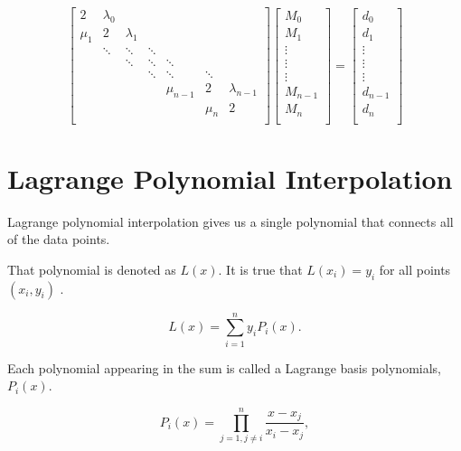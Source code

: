 \documentclass{article}
\begin{document}
 
\begin{equation*}
  \begin{bmatrix}
    2 & \lambda_0 \\ 
    \mu_1 & 2 & \lambda_1 \\ 
    & \ddots & \ddots & \ddots \\
    && \ddots & \ddots & \ddots \\
	&&& \ddots & \ddots & \ddots \\
	&&&& \mu_{n-1} & 2 & \lambda_{n-1} \\ 
	&&&&& \mu_{n} & 2 \\ 
  \end{bmatrix}
   \begin{bmatrix}
    M_0 \\
    M_1 \\
    \vdots \\
    \vdots \\
    \vdots \\
    M_{n-1} \\
    M_n \\
  \end{bmatrix} 
  =
  \begin{bmatrix}
    d_0 \\
    d_1 \\
    \vdots \\
    \vdots \\
    \vdots \\
    d_{n-1} \\
    d_n \\
  \end{bmatrix} 
\end{equation*}

 \newpage
\section*{Lagrange Polynomial Interpolation}

Lagrange polynomial interpolation gives us a single polynomial that connects all of the data points.

That polynomial is denoted as $L(x)$. It is true that $L(x_i) = y_i$ for all points $(x_i, y_i)$ .

$$L(x) = \sum_{i = 1}^n y_i P_i(x).$$

Each polynomial appearing in the sum is called a Lagrange basis polynomials, $P_i(x)$.

$$P_i(x) = \prod_{j = 1, j\ne i}^n\frac{x - x_j}{x_i - x_j},$$
\end{document}
